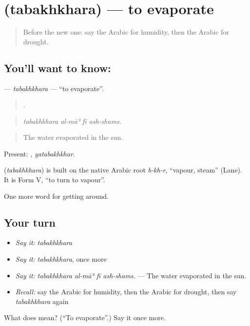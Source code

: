 \section[\texorpdfstring{\ar{تبخر} (tabakhkhara)}{تبخر (tabakhkhara)}]{ (tabakhkhara) — to evaporate}

\label{lesson:AR-C484-tabakhkhara}



\begin{quote}
Before the new one: say the Arabic for humidity, then the Arabic for drought.
\end{quote}

\subsection*{You'll want to know: }
\textbf{} — \emph{tabakhkhara} — \textquotedblleft{}to evaporate\textquotedblright{}.

\begin{quote}
   .
\end{quote}

\begin{quote}
\emph{tabakhkhara al-māʾ fī ash-shams.}
\end{quote}

\begin{quote}
The water evaporated in the sun.
\end{quote}

Present: , \emph{yatabakhkhar}.

\begin{cousinweb}
\textbf{} (\emph{tabakhkhara}) is built on the native Arabic root \emph{b-kh-r}, \textquotedblleft{}vapour, steam\textquotedblright{} (Lane). It is Form V, \textquotedblleft{}to turn to vapour\textquotedblright{}.
\end{cousinweb}

\begin{grammarlens}[title={What you've built}]
One more word for getting around.
\end{grammarlens}

\subsection*{Your turn}
\begin{itemize}
\raggedright
  \item \emph{Say it:} \emph{tabakhkhara}
  \item \emph{Say it:} \emph{tabakhkhara}, once more
  \item \emph{Say it:} \emph{tabakhkhara al-māʾ fī ash-shams.} — The water evaporated in the sun.
  \item \emph{Recall:} say the Arabic for humidity, then the Arabic for drought, then say \emph{tabakhkhara} again
\end{itemize}

\begin{tcolorbox}[breakable,colback=teal!4,colframe=teal!35!black,title={Before you move on}]
What does  mean? (\textquotedblleft{}To evaporate\textquotedblright{}.) Say it once more.
\end{tcolorbox}
